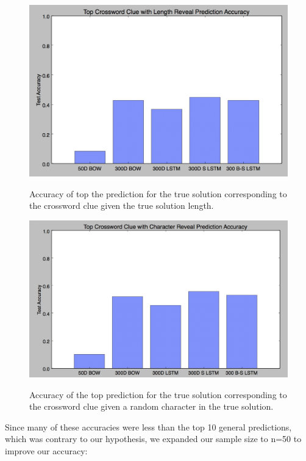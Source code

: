 \documentclass{article} %
\begin{document}
\begin{figure}
	\includegraphics{top10len.png}
	\label{Fig 4}
	\caption{Accuracy of top the prediction for the true solution corresponding to the crossword clue given the true solution length.}
\end{figure}

\begin{figure}
	\includegraphics{top10char.png}
	\label{Fig 5}
	\caption{Accuracy of the top prediction for the true solution corresponding to the crossword clue given a random character in the true solution.}
\end{figure}

Since many of these accuracies were less than the top 10 general predictions, which was contrary to our hypothesis, we expanded our sample size to n=50 to improve our accuracy:
\end{document}
